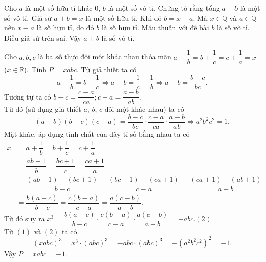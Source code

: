 \begin{vn}
Cho $a$ là một số hữu tỉ khác $0$, $b$ là một số vô tỉ. Chứng tỏ rằng tổng $a+b$ là một số vô tỉ.
\loigiai
{
Giả sử $a+b=x$ là một số hữu tỉ. Khi đó $b=x-a$. Mà $x\in\mathbb{Q}$ và $a\in\mathbb{Q}$ nên $x-a$ là số hữu tỉ, do đó $b$ là số hữu tỉ. Mâu thuẫn với đề bài $b$ là số vô tỉ. Điều giả sử trên sai. Vậy $a+b$ là số vô tỉ.
}
\end{vn}
\begin{vn}
Cho $a,b,c$ là ba số thực đôi một khác nhau thỏa mãn $a+\dfrac{1}{b}=b+\dfrac{1}{c}=c+\dfrac{1}{a}=x$ ($x\in\mathbb{R}$). Tính $P=xabc$.
\loigiai
{
Từ giả thiết ta có \[a+\dfrac{1}{b}=b+\dfrac{1}{c}\Leftrightarrow a-b=\dfrac{1}{c}-\dfrac{1}{b}\Leftrightarrow a-b=\dfrac{b-c}{bc}.\]
Tương tự ta có $b-c=\dfrac{c-a}{ca}; c-a=\dfrac{a-b}{ab}$.\\
Từ đó (sử dụng giả thiết $a$, $b$, $c$ đôi một khác nhau) ta có \[(a-b)(b-c)(c-a)=\dfrac{b-c}{bc}\cdot\dfrac{c-a}{ca}\cdot\dfrac{a-b}{ab}\Rightarrow a^2b^2c^2=1.\tag{1}\]
Mặt khác, áp dụng tính chất của dãy tỉ số bằng nhau ta có
\begin{align*}
x&=a+\dfrac{1}{b}=b+\dfrac{1}{c}=c+\dfrac{1}{a}\\ 
&=\dfrac{ab+1}{b}=\dfrac{bc+1}{c}=\dfrac{ca+1}{a}\\
&=\dfrac{(ab+1)-(bc+1)}{b-c}=\dfrac{(bc+1)-(ca+1)}{c-a}=\dfrac{(ca+1)-(ab+1)}{a-b}\\
&=\dfrac{b(a-c)}{b-c}=\dfrac{c(b-a)}{c-a}=\dfrac{a(c-b)}{a-b}.
\end{align*}
Từ đó suy ra $x^3=\dfrac{b(a-c)}{b-c}\cdot\dfrac{c(b-a)}{c-a}\cdot\dfrac{a(c-b)}{a-b}=-abc$.\hfill$(2)$\\
Từ $(1)$ và $(2)$ ta có \[(xabc)^3=x^3\cdot(abc)^3=-abc\cdot(abc)^3=-(a^2b^2c^2)^2=-1.\]
Vậy $P=xabc=-1.$
}
\end{vn}


